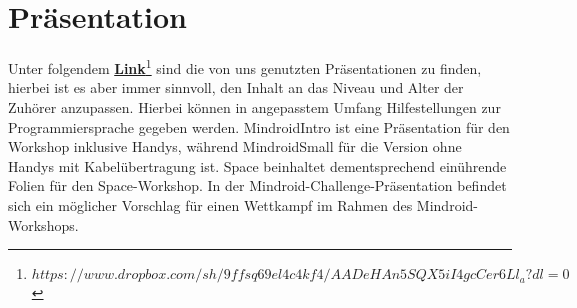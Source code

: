 \documentclass[
	ngerman,
	accentcolor=1c,%
	]{tudapub}
\begin{document}
\section{Pr\"asentation}
Unter folgendem \href{https://www.dropbox.com/sh/9ffsq69el4c4kf4/AADeHAn5SQX5iI4gcCer6Ll_a?dl=0}{\textbf{Link}\footnote{$https://www.dropbox.com/sh/9ffsq69el4c4kf4/AADeHAn5SQX5iI4gcCer6Ll_a?dl=0$}} 
sind die von uns genutzten Pr\"asentationen zu finden, hierbei ist es aber immer sinnvoll, den Inhalt an das Niveau und Alter der Zuh\"orer anzupassen. Hierbei k\"onnen in angepasstem Umfang Hilfestellungen zur Programmiersprache gegeben werden.\newline
MindroidIntro ist eine Pr\"asentation f\"ur den Workshop inklusive Handys, w\"ahrend MindroidSmall f\"ur die Version ohne Handys mit Kabel\"ubertragung ist. Space beinhaltet dementsprechend ein\"uhrende Folien f\"ur den Space-Workshop. In der Mindroid-Challenge-Pr\"asentation befindet sich ein m\"oglicher Vorschlag f\"ur einen Wettkampf im Rahmen des Mindroid-Workshops.



\cfoot{\textcolor{lightgray} \today}
\end{document}
